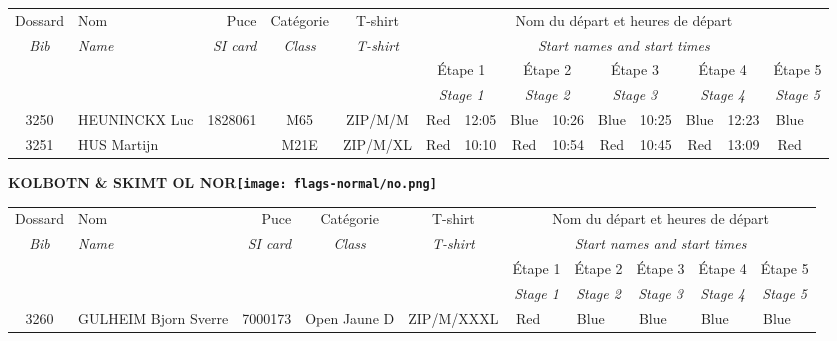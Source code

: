 \documentclass{report}
\begin{document}
  \begin{longtable}{|c|l|r|c|c|*{5}{cc|}}
    Dossard & Nom  & Puce    & Catégorie & T-shirt & \multicolumn{10}{c|}{Nom du départ et heures de départ} \\
    \itshape Bib     & \itshape Name & \itshape SI card & \itshape Class  & \itshape  T-shirt  & \multicolumn{10}{c|}{\itshape Start names and start times} \\
    \hline
    & & & & & \multicolumn{2}{c|}{Étape 1} & \multicolumn{2}{c|}{Étape 2} & \multicolumn{2}{c|}{Étape 3} & \multicolumn{2}{c|}{Étape 4} & \multicolumn{2}{c|}{Étape 5} \\
    & & & & & \multicolumn{2}{c|}{\itshape Stage 1} & \multicolumn{2}{c|}{\itshape Stage 2} & \multicolumn{2}{c|}{\itshape Stage 3} & \multicolumn{2}{c|}{\itshape Stage 4} & \multicolumn{2}{c|}{\itshape Stage 5} \\
    \hline
    3250 & HEUNINCKX Luc & 1828061 & M65 & ZIP/M/M & Red & 12:05 & Blue & 10:26 & Blue & 10:25 & Blue & 12:23 & Blue &  \\
    3251 & HUS Martijn &  & M21E & ZIP/M/XL & Red & 10:10 & Red & 10:54 & Red & 10:45 & Red & 13:09 & Red &  \\
  \end{longtable}
\newpage
  \Huge \centering \bfseries KOLBOTN \& SKIMT OL  NOR\normalfont \footnotesize \sffamily \hfill \texttt{[image: flags-normal/no.png]} \newline 
  \begin{longtable}{|c|l|r|c|c|*{5}{cc|}}
    Dossard & Nom  & Puce    & Catégorie & T-shirt & \multicolumn{10}{c|}{Nom du départ et heures de départ} \\
    \itshape Bib     & \itshape Name & \itshape SI card & \itshape Class  & \itshape  T-shirt  & \multicolumn{10}{c|}{\itshape Start names and start times} \\
    \hline
    & & & & & \multicolumn{2}{c|}{Étape 1} & \multicolumn{2}{c|}{Étape 2} & \multicolumn{2}{c|}{Étape 3} & \multicolumn{2}{c|}{Étape 4} & \multicolumn{2}{c|}{Étape 5} \\
    & & & & & \multicolumn{2}{c|}{\itshape Stage 1} & \multicolumn{2}{c|}{\itshape Stage 2} & \multicolumn{2}{c|}{\itshape Stage 3} & \multicolumn{2}{c|}{\itshape Stage 4} & \multicolumn{2}{c|}{\itshape Stage 5} \\
    \hline
    3260 & GULHEIM Bjorn Sverre & 7000173 & Open Jaune D & ZIP/M/XXXL & Red &   & Blue &   & Blue &   & Blue &   & Blue &  \\
  \end{longtable}
\end{document}
